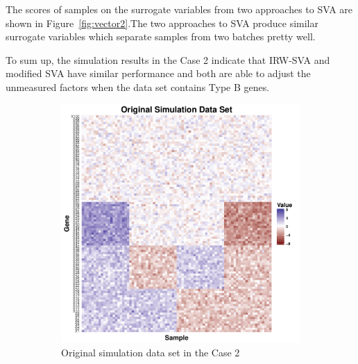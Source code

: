 \documentclass[11pt]{article}
\begin{document}
The scores of samples on the surrogate variables from two approaches to SVA are shown in Figure~\ref{fig:vector2}.The two approaches to SVA produce similar surrogate variables which separate samples from two batches pretty well.

To sum up, the simulation results in the Case 2 indicate that IRW-SVA and modified SVA have similar performance and both are able to adjust the unmeasured factors when the data set contains Type B genes.

\begin{figure}[h!]
    \centering
    \begin{subfigure}[b]{0.31\textwidth}
        \centering
        \includegraphics[width = \textwidth]{figures/simulate2.pdf}
        \caption{Original simulation data set in the Case 2}
        \label{fig:data2}
    \end{subfigure}%
~
    \begin{subfigure}[b]{0.31\textwidth}
        \centering

\end{subfigure}
\end{figure}
\end{document}
